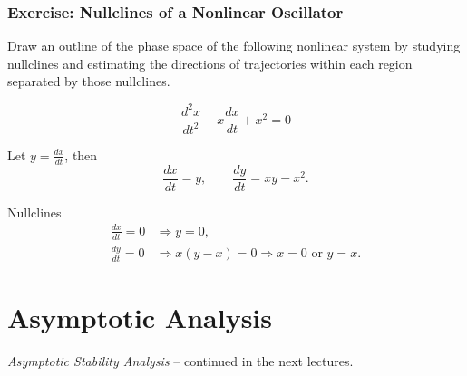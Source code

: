 \documentclass{beamer}
\begin{document}
\begin{frame}
\frametitle{Exercise: Nullclines of a Nonlinear Oscillator}

\tiny
\begin{block}{}
Draw an outline of the phase space of the following nonlinear system
by studying nullclines and estimating the directions of trajectories within
each region separated by those nullclines.
\end{block}

\[
\frac{d^2x}{dt^2} - x\frac{dx}{dt} + x^2 = 0
\]

Let \( y = \frac{dx}{dt} \), then
\[
\frac{dx}{dt} = y, \qquad \frac{dy}{dt} = xy - x^2.
\]

\begin{block}{Nullclines}
\[
\begin{aligned}
\frac{dx}{dt} = 0 &\Rightarrow y = 0, \\
\frac{dy}{dt} = 0 &\Rightarrow x(y - x) = 0 \Rightarrow x=0 \text{ or } y=x.
\end{aligned}
\]
\end{block}

\end{frame}


\section{Asymptotic Analysis}

\begin{frame}

\emph{Asymptotic Stability Analysis} -- continued in the next lectures.
\end{frame}
\end{document}
